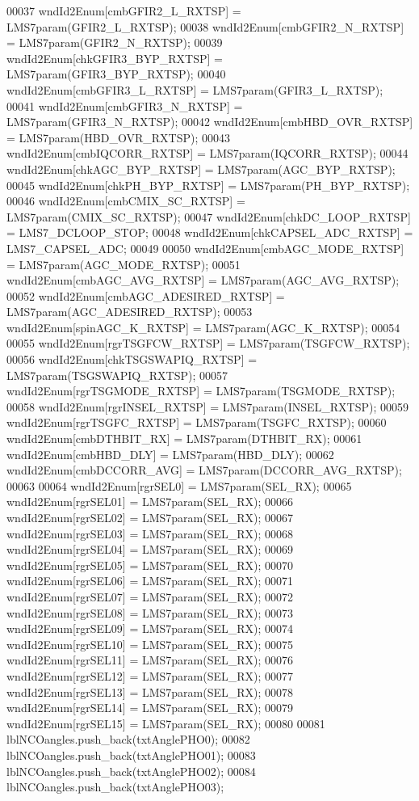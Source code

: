 \begin{DoxyCode}
00037     wndId2Enum[cmbGFIR2_L_RXTSP] = LMS7param(GFIR2_L_RXTSP);
00038     wndId2Enum[cmbGFIR2_N_RXTSP] = LMS7param(GFIR2_N_RXTSP);
00039     wndId2Enum[chkGFIR3_BYP_RXTSP] = LMS7param(GFIR3_BYP_RXTSP);
00040     wndId2Enum[cmbGFIR3_L_RXTSP] = LMS7param(GFIR3_L_RXTSP);
00041     wndId2Enum[cmbGFIR3_N_RXTSP] = LMS7param(GFIR3_N_RXTSP);
00042     wndId2Enum[cmbHBD_OVR_RXTSP] = LMS7param(HBD_OVR_RXTSP);
00043     wndId2Enum[cmbIQCORR_RXTSP] = LMS7param(IQCORR_RXTSP);
00044     wndId2Enum[chkAGC_BYP_RXTSP] = LMS7param(AGC_BYP_RXTSP);
00045     wndId2Enum[chkPH_BYP_RXTSP] = LMS7param(PH_BYP_RXTSP);
00046     wndId2Enum[cmbCMIX_SC_RXTSP] = LMS7param(CMIX_SC_RXTSP);
00047     wndId2Enum[chkDC_LOOP_RXTSP] = LMS7_DCLOOP_STOP;
00048     wndId2Enum[chkCAPSEL_ADC_RXTSP] = LMS7_CAPSEL_ADC;
00049 
00050     wndId2Enum[cmbAGC_MODE_RXTSP] = LMS7param(AGC_MODE_RXTSP);
00051     wndId2Enum[cmbAGC_AVG_RXTSP] = LMS7param(AGC_AVG_RXTSP);
00052     wndId2Enum[cmbAGC_ADESIRED_RXTSP] = LMS7param(AGC_ADESIRED_RXTSP);
00053     wndId2Enum[spinAGC_K_RXTSP] = LMS7param(AGC_K_RXTSP);
00054 
00055     wndId2Enum[rgrTSGFCW_RXTSP] = LMS7param(TSGFCW_RXTSP);
00056     wndId2Enum[chkTSGSWAPIQ_RXTSP] = LMS7param(TSGSWAPIQ_RXTSP);
00057     wndId2Enum[rgrTSGMODE_RXTSP] = LMS7param(TSGMODE_RXTSP);
00058     wndId2Enum[rgrINSEL_RXTSP] = LMS7param(INSEL_RXTSP);
00059     wndId2Enum[rgrTSGFC_RXTSP] = LMS7param(TSGFC_RXTSP);
00060     wndId2Enum[cmbDTHBIT_RX] = LMS7param(DTHBIT_RX);
00061     wndId2Enum[cmbHBD_DLY] = LMS7param(HBD\_DLY);
00062     wndId2Enum[cmbDCCORR_AVG] = LMS7param(DCCORR_AVG_RXTSP);
00063 
00064     wndId2Enum[rgrSEL0] = LMS7param(SEL_RX);
00065     wndId2Enum[rgrSEL01] = LMS7param(SEL_RX);
00066     wndId2Enum[rgrSEL02] = LMS7param(SEL_RX);
00067     wndId2Enum[rgrSEL03] = LMS7param(SEL_RX);
00068     wndId2Enum[rgrSEL04] = LMS7param(SEL_RX);
00069     wndId2Enum[rgrSEL05] = LMS7param(SEL_RX);
00070     wndId2Enum[rgrSEL06] = LMS7param(SEL_RX);
00071     wndId2Enum[rgrSEL07] = LMS7param(SEL_RX);
00072     wndId2Enum[rgrSEL08] = LMS7param(SEL_RX);
00073     wndId2Enum[rgrSEL09] = LMS7param(SEL_RX);
00074     wndId2Enum[rgrSEL10] = LMS7param(SEL_RX);
00075     wndId2Enum[rgrSEL11] = LMS7param(SEL_RX);
00076     wndId2Enum[rgrSEL12] = LMS7param(SEL_RX);
00077     wndId2Enum[rgrSEL13] = LMS7param(SEL_RX);
00078     wndId2Enum[rgrSEL14] = LMS7param(SEL_RX);
00079     wndId2Enum[rgrSEL15] = LMS7param(SEL_RX);
00080 
00081     lblNCOangles.push\_back(txtAnglePHO0);
00082     lblNCOangles.push\_back(txtAnglePHO01);
00083     lblNCOangles.push\_back(txtAnglePHO02);
00084     lblNCOangles.push\_back(txtAnglePHO03);

\end{DoxyCode}
